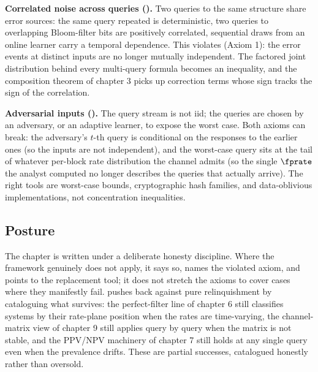 \textbf{Correlated noise across queries ().}
Two queries to the same structure share error sources: the same query
repeated is deterministic, two queries to overlapping Bloom-filter bits
are positively correlated, sequential draws from an online learner carry
a temporal dependence. This violates  (Axiom 1):
the error events at distinct inputs are no longer mutually independent.
The factored joint distribution behind every multi-query formula becomes
an inequality, and the composition theorem of chapter 3 picks up
correction terms whose sign tracks the sign of the correlation.

\textbf{Adversarial inputs ().} The query
stream is not iid; the queries are chosen by an adversary, or an adaptive
learner, to expose the worst case. Both axioms can break: the adversary's
$t$-th query is conditional on the responses to the earlier ones (so the
inputs are not independent), and the worst-case query sits at the tail of
whatever per-block rate distribution the channel admits (so the single
$\fprate$ the analyst computed no longer describes the queries that
actually arrive). The right tools are worst-case bounds, cryptographic
hash families, and data-oblivious implementations, not concentration
inequalities.

\subsection*{Posture}

The chapter is written under a deliberate honesty discipline. Where the
framework genuinely does not apply, it says so, names the violated axiom,
and points to the replacement tool; it does not stretch the axioms to
cover cases where they manifestly fail. 
pushes back against pure relinquishment by cataloguing what survives: the
perfect-filter line of chapter 6 still classifies systems by their
rate-plane position when the rates are time-varying, the channel-matrix
view of chapter 9 still applies query by query when the matrix is not
stable, and the PPV/NPV machinery of chapter 7 still holds at any single
query even when the prevalence drifts. These are partial successes,
catalogued honestly rather than oversold.
